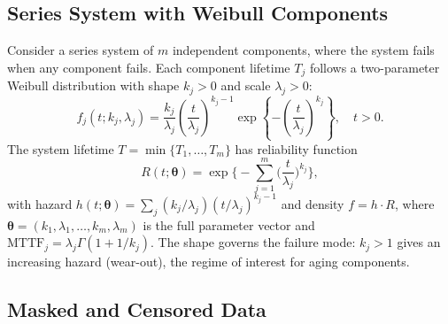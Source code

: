 \documentclass[11pt]{article}
\renewcommand{\v}[1]{\boldsymbol{#1}}
\newcommand{\MTTF}{\mathrm{MTTF}}
\begin{document}
\subsection{Series System with Weibull Components}

Consider a series system of $m$ independent components, where the system fails when any component fails. Each component lifetime $T_j$ follows a two-parameter Weibull distribution with shape $k_j > 0$ and scale $\lambda_j > 0$:
\begin{equation}
f_j(t; k_j, \lambda_j) = \frac{k_j}{\lambda_j}\left(\frac{t}{\lambda_j}\right)^{k_j-1} \exp\left\{-\left(\frac{t}{\lambda_j}\right)^{k_j}\right\}, \quad t > 0.
\end{equation}
The system lifetime $T = \min\{T_1, \ldots, T_m\}$ has reliability function
\begin{equation}
\label{eq:sys_reliability}
R(t;\v\theta) = \exp\biggl\{-\sum_{j=1}^{m}\biggl(\frac{t}{\lambda_j}\biggr)^{k_j}\biggr\},
\end{equation}
with hazard $h(t;\v\theta) = \sum_j (k_j/\lambda_j)(t/\lambda_j)^{k_j-1}$ and density $f = h \cdot R$, where $\v\theta = (k_1, \lambda_1, \ldots, k_m, \lambda_m)$ is the full parameter vector and $\MTTF_j = \lambda_j \Gamma(1 + 1/k_j)$. The shape governs the failure mode: $k_j>1$ gives an increasing hazard (wear-out), the regime of interest for aging components.

\subsection{Masked and Censored Data}
\label{sec:masked}
\end{document}
